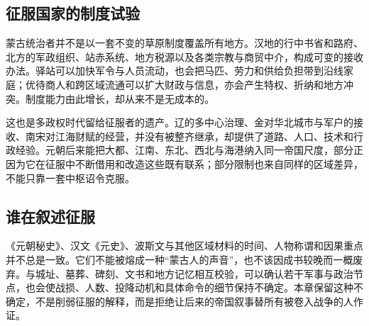 \subsection{征服国家的制度试验}

蒙古统治者并不是以一套不变的草原制度覆盖所有地方。汉地的行中书省和路府、北方的军政组织、站赤系统、地方税源以及各类宗教与商贸中介，构成可变的接收办法。驿站可以加快军令与人员流动，也会把马匹、劳力和供给负担带到沿线家庭；优待商人和跨区域流通可以扩大财政与信息，亦会产生特权、折纳和地方冲突。制度能力由此增长，却从来不是无成本的。

这也是多政权时代留给征服者的遗产。辽的多中心治理、金对华北城市与军户的接收、南宋对江海财赋的经营，并没有被整齐继承，却提供了道路、人口、技术和行政经验。元朝后来能把大都、江南、东北、西北与海港纳入同一帝国尺度，部分正因为它在征服中不断借用和改造这些既有联系；部分限制也来自同样的区域差异，不能只靠一套中枢诏令克服。

\subsection{谁在叙述征服}

《元朝秘史》、汉文《元史》、波斯文与其他区域材料的时间、人物称谓和因果重点并不总是一致。它们不能被熔成一种“蒙古人的声音”，也不该因成书较晚而一概废弃。与城址、墓葬、碑刻、文书和地方记忆相互校验，可以确认若干军事与政治节点，也会使战损、人数、投降动机和具体命令的细节保持不确定。本章保留这种不确定，不是削弱征服的解释，而是拒绝让后来的帝国叙事替所有被卷入战争的人作证。
